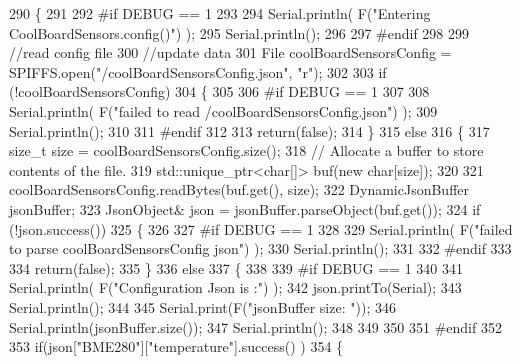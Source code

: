 \begin{DoxyCode}
290 \{
291 
292 \textcolor{preprocessor}{#if DEBUG == 1}
293 
294     Serial.println( F(\textcolor{stringliteral}{"Entering CoolBoardSensors.config()"}) );
295     Serial.println();
296 
297 \textcolor{preprocessor}{#endif}
298 
299     \textcolor{comment}{//read config file}
300     \textcolor{comment}{//update data}
301     File coolBoardSensorsConfig = SPIFFS.open(\textcolor{stringliteral}{"/coolBoardSensorsConfig.json"}, \textcolor{stringliteral}{"r"});
302 
303     \textcolor{keywordflow}{if} (!coolBoardSensorsConfig) 
304     \{
305     
306 \textcolor{preprocessor}{    #if DEBUG == 1}
307 
308         Serial.println( F(\textcolor{stringliteral}{"failed to read /coolBoardSensorsConfig.json"}) );
309         Serial.println();
310     
311 \textcolor{preprocessor}{    #endif}
312 
313         \textcolor{keywordflow}{return}(\textcolor{keyword}{false});
314     \}
315     \textcolor{keywordflow}{else}
316     \{
317         \textcolor{keywordtype}{size\_t} size = coolBoardSensorsConfig.size();
318         \textcolor{comment}{// Allocate a buffer to store contents of the file.}
319         std::unique\_ptr<char[]> buf(\textcolor{keyword}{new} \textcolor{keywordtype}{char}[size]);
320 
321         coolBoardSensorsConfig.readBytes(buf.get(), size);
322         DynamicJsonBuffer jsonBuffer;
323         JsonObject& json = jsonBuffer.parseObject(buf.get());
324         \textcolor{keywordflow}{if} (!json.success()) 
325         \{
326         
327 \textcolor{preprocessor}{        #if DEBUG == 1}
328 
329             Serial.println( F(\textcolor{stringliteral}{"failed to parse coolBoardSensorsConfig json"}) );
330             Serial.println();
331         
332 \textcolor{preprocessor}{        #endif}
333     
334             \textcolor{keywordflow}{return}(\textcolor{keyword}{false});
335         \} 
336         \textcolor{keywordflow}{else}
337         \{
338 
339 \textcolor{preprocessor}{        #if DEBUG == 1}
340 
341             Serial.println( F(\textcolor{stringliteral}{"Configuration Json is :"}) );
342             json.printTo(Serial);
343             Serial.println();
344 
345             Serial.print(F(\textcolor{stringliteral}{"jsonBuffer size: "}));
346             Serial.println(jsonBuffer.size());
347             Serial.println();
348 
349             
350         
351 \textcolor{preprocessor}{        #endif}
352             
353             \textcolor{keywordflow}{if}(json[\textcolor{stringliteral}{"BME280"}][\textcolor{stringliteral}{"temperature"}].success() )
354             \{           

\end{DoxyCode}
